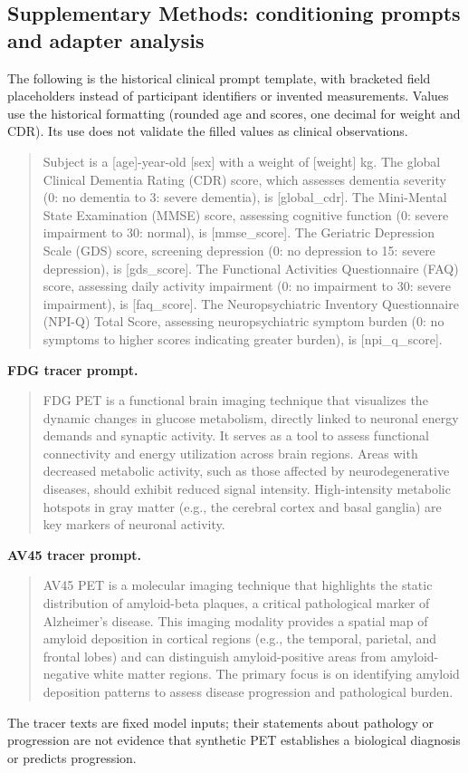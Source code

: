 \subsection*{Supplementary Methods: conditioning prompts and adapter analysis}
The following is the historical clinical prompt template, with bracketed field placeholders instead of participant identifiers or invented measurements. Values use the historical formatting (rounded age and scores, one decimal for weight and CDR). Its use does not validate the filled values as clinical observations.
\begin{quote}\small
Subject is a [age]-year-old [sex] with a weight of [weight] kg. The global Clinical Dementia Rating (CDR) score, which assesses dementia severity (0: no dementia to 3: severe dementia), is [global\_cdr]. The Mini-Mental State Examination (MMSE) score, assessing cognitive function (0: severe impairment to 30: normal), is [mmse\_score]. The Geriatric Depression Scale (GDS) score, screening depression (0: no depression to 15: severe depression), is [gds\_score]. The Functional Activities Questionnaire (FAQ) score, assessing daily activity impairment (0: no impairment to 30: severe impairment), is [faq\_score]. The Neuropsychiatric Inventory Questionnaire (NPI-Q) Total Score, assessing neuropsychiatric symptom burden (0: no symptoms to higher scores indicating greater burden), is [npi\_q\_score].
\end{quote}
\noindent\textbf{FDG tracer prompt.}
\begin{quote}\small
FDG PET is a functional brain imaging technique that visualizes the dynamic changes in glucose metabolism, directly linked to neuronal energy demands and synaptic activity. It serves as a tool to assess functional connectivity and energy utilization across brain regions. Areas with decreased metabolic activity, such as those affected by neurodegenerative diseases, should exhibit reduced signal intensity. High-intensity metabolic hotspots in gray matter (e.g., the cerebral cortex and basal ganglia) are key markers of neuronal activity. 
\end{quote}
\noindent\textbf{AV45 tracer prompt.}
\begin{quote}\small
AV45 PET is a molecular imaging technique that highlights the static distribution of amyloid-beta plaques, a critical pathological marker of Alzheimer's disease. This imaging modality provides a spatial map of amyloid deposition in cortical regions (e.g., the temporal, parietal, and frontal lobes) and can distinguish amyloid-positive areas from amyloid-negative white matter regions. The primary focus is on identifying amyloid deposition patterns to assess disease progression and pathological burden.
\end{quote}
The tracer texts are fixed model inputs; their statements about pathology or progression are not evidence that synthetic PET establishes a biological diagnosis or predicts progression.


